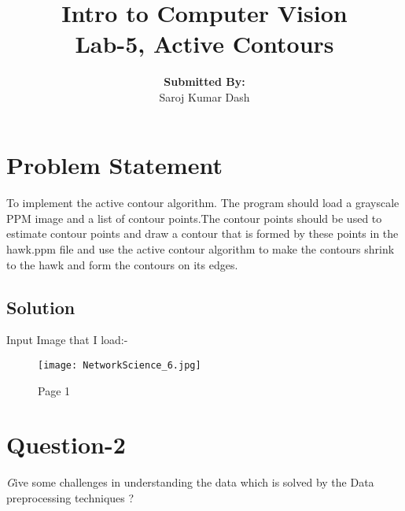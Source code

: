 \documentclass{article}
\title{\textbf{Intro to Computer Vision \\Lab-5, Active Contours}\vfill{}}
\author{\textbf{Submitted By:}\\Saroj Kumar Dash}
\begin{document}
	\begin{titlepage}
		\maketitle
	\end{titlepage}
	
\newpage
\section{Problem Statement}
\paragraph{}  To implement the active contour algorithm.  The program should load a grayscale PPM image and a list of contour points.The contour points should be used to estimate contour points and draw a contour that is formed by these points in the hawk.ppm file and use the active contour algorithm to make the contours shrink to the hawk and form the contours on its edges.

\subsection{Solution}

Input Image that I load:-
\begin{figure}[!htb]
    \centering
  		\texttt{[image: NetworkScience\_6.jpg]} 
  		\caption{Page 1}
  		\label{Fig1}
 \end{figure}

\section{Question-2} \textit Give some challenges in understanding the data which is solved by the Data preprocessing techniques ?
\end{document}
